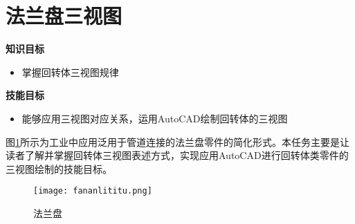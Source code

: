 \section{法兰盘三视图}

{\bfseries 知识目标}
\begin{itemize}
\item 掌握回转体三视图规律
\end{itemize}

{\bfseries 技能目标}
\begin{itemize}
\item 能够应用三视图对应关系，运用AutoCAD绘制回转体的三视图
\end{itemize}

图\ref{fig:falanpanlititu}所示为工业中应用泛用于管道连接的法兰盘零件的简化形式。本任务主要是让读者了解并掌握回转体三视图表述方式，实现应用AutoCAD进行回转体类零件的三视图绘制的技能目标。
\begin{figure}[htbp]
\centering
\texttt{[image: fananlititu.png]}
\caption{法兰盘}\label{fig:falanpanlititu}
\end{figure}


\endinput